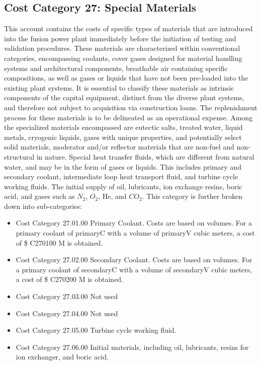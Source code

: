 
\subsection{Cost Category 27: Special Materials}

This account contains the costs of specific types of materials that are introduced into the fusion power plant immediately before the initiation of testing and validation procedures. These materials are characterized within conventional categories, encompassing coolants, cover gases designed for material handling systems and architectural components, breathable air containing specific compositions, as well as gases or liquids that have not been pre-loaded into the existing plant systems. It is essential to classify these materials as intrinsic components of the capital equipment, distinct from the diverse plant systems, and therefore not subject to acquisition via construction loans. The replenishment process for  these materials is to be delineated as an operational expense. Among the specialized materials encompassed are eutectic salts, treated water, liquid metals,  cryogenic liquids, gases with unique properties, and potentially select solid materials, moderator and/or reflector materials that are non-fuel and non-structural in nature. Special heat transfer fluids, which are different from natural water, and may be in the form of gases or liquids. This includes primary and secondary coolant, intermediate loop heat transport fluid, and turbine cycle working fluids. The initial supply of oil, lubricants, ion exchange resins, boric acid, and gases such as $N_2$, $O_2$, He, and $CO_2$.
This category is further broken down into sub-categories:

\begin{itemize}
    \item Cost Category 27.01.00 Primary Coolant. Costs are based on volumes. For a primary coolant of primaryC with a volume of primaryV cubic meters, a cost of \$ C270100 M is obtained.
    \item Cost Category 27.02.00 Secondary Coolant. Costs are based on volumes. For a primary coolant of secondaryC with a volume of secondaryV cubic meters, a cost of \$ C270200 M is obtained.
    \item Cost Category 27.03.00 Not used
    \item Cost Category 27.04.00 Not used
    \item Cost Category 27.05.00 Turbine cycle working fluid.
    \item Cost Category 27.06.00 Initial materials, including oil, lubricants, resins for ion exchanger, and boric acid.
\end{itemize}

